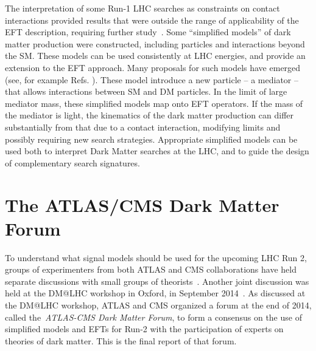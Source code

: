 The interpretation of some Run-1 LHC searches as constraints on contact interactions
provided results that were outside the range of applicability of the EFT
description, requiring further study~\cite{Bai:2010hh,Kopp:2011eu,Fox:2011fx,Fox:2011pm,Shoemaker:2011vi,Busoni:2013lha}.
Some ``simplified models'' \cite{Alwall:2008ag,Goodman:2011jq,Alves:2011wf}
of dark matter production were constructed, including particles and interactions beyond the SM.
These models can be used consistently at LHC energies, and provide
an extension to the EFT approach. 
Many proposals for such models have emerged (see, for example
Refs. \cite{An:2012va,An:2012ue,Tait:2013,Buchmueller:2013dya,Bai:2013iqa,Bai:2014osa,An:2013xka,Yavin:14092893,Malik:2014ggr,Harris:2014hga,Buckley:2014fba,Haisch:2015ioa,Bai:2012xg,Carpenter:2012rg,Bell:2012rg,Petrov:2013nia,Carpenter:2013xra}). 
These model introduce a new particle -- a mediator -- that allows
interactions between SM and DM particles.
In the limit of large mediator mass, these simplified models map onto
EFT operators.
If the mass of the mediator is light, the kinematics of the
dark matter production can differ substantially from that due to a contact
interaction, modifying limits and possibly requiring new search strategies.
Appropriate simplified models can be used both to
interpret Dark Matter searches at the LHC, and to guide the design of complementary
search signatures.

\section{The ATLAS/CMS Dark Matter Forum}

To understand what signal models should be used for the upcoming LHC Run 2, groups of experimenters from 
both ATLAS and CMS collaborations have held separate discussions with small groups of
theorists~\cite{Malik:2014ggr,Yavin:14092893}. 
Another joint discussion was held at the DM@LHC workshop in Oxford, in 
September 2014~\cite{DMatLHCProceedings}. 
As discussed at the DM@LHC workshop, ATLAS and CMS organized a forum at the
end of 2014, called the~\textit{ATLAS-CMS Dark
Matter Forum}, to form a consensus on the use of simplified models
and EFTs for Run-2 with the participation of experts on
theories of dark matter. This is the final report of that forum.

